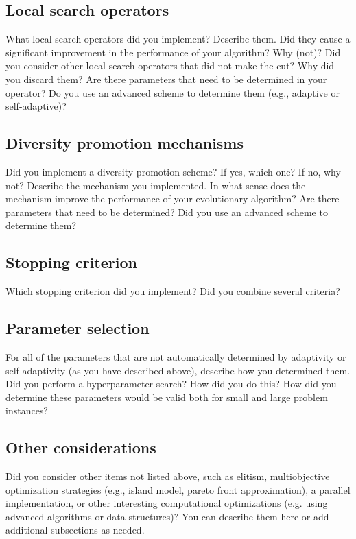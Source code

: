 \documentclass[a4paper,10pt]{article}
\newcommand{\ReplaceMe}[1]{{\color{blue}#1}}
\begin{document}
\subsection{Local search operators}
\label{local_search_operator}
\ReplaceMe{What local search operators did you implement? Describe them. Did they cause a significant improvement in the performance of your algorithm? Why (not)? Did you consider other local search operators that did not make the cut? Why did you discard them? Are there parameters that need to be determined in your operator? Do you use an advanced scheme to determine them (e.g., adaptive or self-adaptive)?}

\subsection{Diversity promotion mechanisms}
\label{diversity_promotion}
\ReplaceMe{Did you implement a diversity promotion scheme? If yes, which one? If no, why not? Describe the mechanism you implemented. In what sense does the mechanism improve the performance of your evolutionary algorithm? Are there parameters that need to be determined? Did you use an advanced scheme to determine them?}

\subsection{Stopping criterion}

\ReplaceMe{Which stopping criterion did you implement? Did you combine several criteria?}

\subsection{Parameter selection}

\ReplaceMe{For all of the parameters that are not automatically determined by adaptivity or self-adaptivity (as you have described above), describe how you determined them. Did you perform a hyperparameter search? How did you do this? How did you determine these parameters would be valid both for small and large problem instances?}

\subsection{Other considerations}

\ReplaceMe{Did you consider other items not listed above, such as elitism, multiobjective optimization strategies (e.g., island model, pareto front approximation), a parallel implementation, or other interesting computational optimizations (e.g. using advanced algorithms or data structures)? You can describe them here or add additional subsections as needed.}
\end{document}
